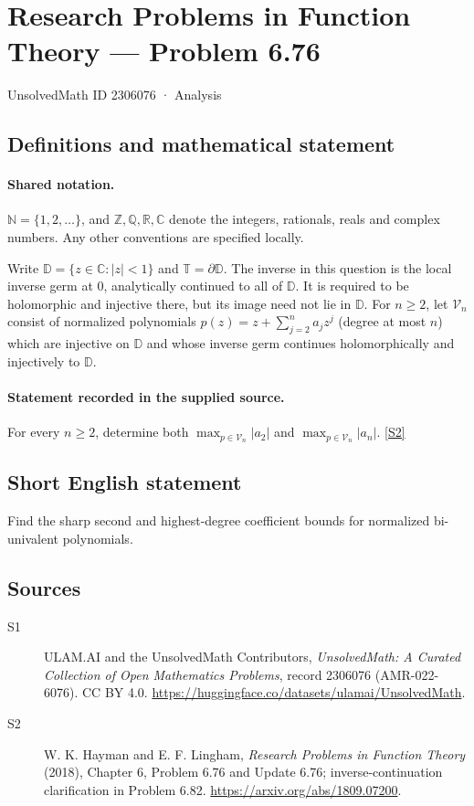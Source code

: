 \documentclass[11pt]{article}
\newcommand{\sref}[2]{\hyperlink{source:#1:#2}{[S#2]}}
\begin{document}
\setcounter{section}{2306075}
\section{Research Problems in Function Theory — Problem 6.76}\label{2306076}
{\small\sffamily UnsolvedMath ID 2306076 · Analysis}
\subsection{Definitions and mathematical statement}

\paragraph{Shared notation.}$\mathbb N=\{1,2,\ldots\}$, and $\mathbb Z,\mathbb Q,\mathbb R,\mathbb C$ denote the integers, rationals, reals and complex numbers. Any other conventions are specified locally.


Write $\mathbb D=\{z\in\mathbb C:|z|<1\}$ and $\mathbb T=\partial\mathbb D$. The inverse in this question is the local inverse germ at $0$, analytically continued to all of $\mathbb D$. It is required to be holomorphic and injective there, but its image need not lie in $\mathbb D$. For $n\ge2$, let $\mathcal V_n$ consist of normalized polynomials $p(z)=z+\sum_{j=2}^n a_jz^j$ (degree at most $n$) which are injective on $\mathbb D$ and whose inverse germ continues holomorphically and injectively to $\mathbb D$.
\paragraph{Statement recorded in the supplied source.}
For every $n\ge2$, determine both $\max_{p\in\mathcal V_n}|a_2|$ and $\max_{p\in\mathcal V_n}|a_n|$. \sref{2306076}{2}
\subsection{Short English statement}
Find the sharp second and highest-degree coefficient bounds for normalized bi-univalent polynomials.
\subsection{Sources}
\begin{description}
\item[\hypertarget{source:2306076:1}{S1}] ULAM.AI and the UnsolvedMath Contributors, \emph{UnsolvedMath: A Curated Collection of Open Mathematics Problems}, record 2306076 (AMR-022-6076). CC BY 4.0. \url{https://huggingface.co/datasets/ulamai/UnsolvedMath}.
\item[\hypertarget{source:2306076:2}{S2}] W. K. Hayman and E. F. Lingham, \emph{Research Problems in Function Theory} (2018), Chapter 6, Problem 6.76 and Update 6.76; inverse-continuation clarification in Problem 6.82. \url{https://arxiv.org/abs/1809.07200}.
\end{description}
\label{end:2306076}
\end{document}
